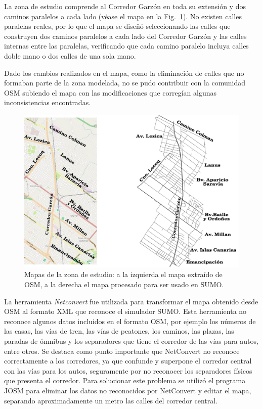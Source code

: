 La zona de estudio comprende al Corredor Garzón en toda su extensión y dos caminos paralelos a cada lado (véase el mapa en la Fig.~\ref{fig:mapa_osm_sumo}). No existen calles paralelas reales, por lo que el mapa se diseñó seleccionando las calles que construyen dos caminos paralelos a cada lado del Corredor Garzón y las calles internas entre las paralelas, verificando que cada camino paralelo incluya calles doble mano o dos calles de una sola mano.

Dado los cambios realizados en el mapa, como la eliminación de calles que no formaban parte de la zona modelada, no se pudo contribuir con la comunidad OSM subiendo el mapa con las modificaciones que corregían algunas inconsistencias encontradas.

\begin{figure}[!htb]
	\centering
	\includegraphics[width=0.7\linewidth]{Figures/mapa_osm_sumo_1}
	\caption[Mapa del Corredor Garzón]{Mapas de la zona de estudio: a la izquierda el mapa extraído de OSM, a la derecha el mapa procesado para ser usado en SUMO.}
	\label{fig:mapa_osm_sumo}
\end{figure}

La herramienta \emph{Netconvert} fue utilizada para transformar el mapa obtenido desde OSM al formato XML que reconoce el simulador SUMO. Esta herramienta no reconoce algunos datos incluidos en el formato OSM, por ejemplo los números de las casas, las vías de tren, las vías de peatones, los caminos, las plazas, las paradas de ómnibus y los separadores que tiene el corredor de las vías para autos, entre otros. Se destaca como punto importante que NetConvert no reconoce correctamente a los corredores, ya que confunde y superpone el corredor central con las vías para los autos, seguramente por no reconocer los separadores físicos que presenta el corredor. Para solucionar este problema se utilizó el programa JOSM para eliminar los datos no reconocidos por NetConvert y editar el mapa, separando aproximadamente un metro las calles del corredor central.


